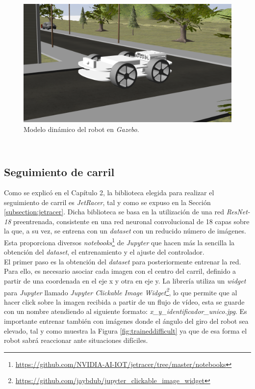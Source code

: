 \begin{figure} [h!]
	\begin{center}
		\includegraphics[width=12cm]{figs/modelGazebo}
	\end{center}
	\caption{Modelo dinámico del robot en \textit{Gazebo}.}
	\label{fig:modelGazebo}
\end{figure}\

\subsection{Seguimiento de carril}
\label{subsection:lanefollower}
Como se explicó en el Capítulo 2, la biblioteca elegida para realizar el seguimiento de carril es \textit{JetRacer}, tal y como se expuso en la Sección \ref{subsection:jetracer}. Dicha biblioteca se basa en la utilización de una red \textit{ResNet-18} preentrenada, consistente en una red neuronal convolucional de 18 capas sobre la que, a su vez, se entrena con un \textit{dataset} con un reducido número de imágenes. Esta proporciona diversos \textit{notebooks}\footnote{\url{https://github.com/NVIDIA-AI-IOT/jetracer/tree/master/notebooks}} de \textit{Jupyter} que hacen más la sencilla la obtención del \textit{dataset}, el entrenamiento y el ajuste del controlador.\\

El primer paso es la obtención del \textit{dataset} para posteriormente entrenar la red. Para ello, es necesario asociar cada imagen con el centro del carril, definido a partir de una coordenada en el eje x y otra en eje y. La librería utiliza un \textit{widget} para \textit{Jupyter} llamado \textit{Jupyter Clickable Image Widget\footnote{\url{https://github.com/jaybdub/jupyter_clickable_image_widget}}}, lo que permite que al hacer click sobre la imagen recibida a partir de un flujo de vídeo, esta se guarde con un nombre atendiendo al siguiente formato: \textit{x\_y\_identificador\_unico.jpg}. Es importante entrenar también con imágenes donde el ángulo del giro del robot sea elevado, tal y como muestra la Figura \ref{fig:traineddifficult} ya que de esa forma el robot sabrá reaccionar ante situaciones difíciles.\\

